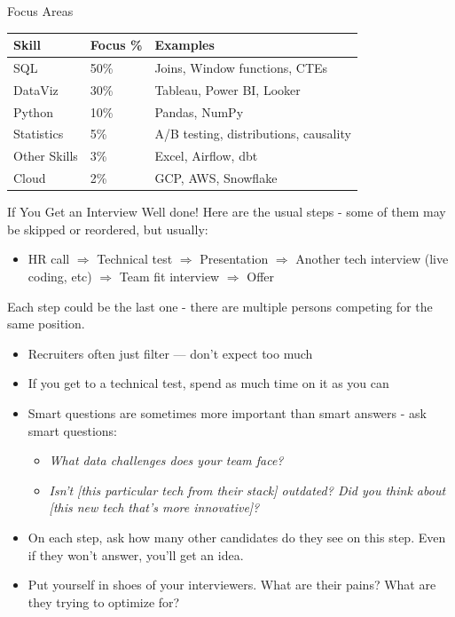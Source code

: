 \documentclass[10pt,a4paper]{article}
\begin{document}
\begin{multicols}{3}
\begin{textbox}{Focus Areas}
\begin{tabular}{l|l|l}
\textbf{Skill} & \textbf{Focus \%} & \textbf{Examples} \\
\hline
SQL & 50\% & Joins, Window functions, CTEs \\
DataViz & 30\% & Tableau, Power BI, Looker \\
Python & 10\% & Pandas, NumPy \\
Statistics & 5\% & A/B testing, distributions, causality \\
Other Skills & 3\% & Excel, Airflow, dbt \\
Cloud & 2\% & GCP, AWS, Snowflake \\
\end{tabular}
\end{textbox}
\begin{textboxGreen}{If You Get an Interview}
Well done! Here are the usual steps - some of them may be skipped or reordered, but usually:

\begin{itemize}
    \item HR call $\Rightarrow$ Technical test $\Rightarrow$ Presentation $\Rightarrow$ Another tech interview (live coding, etc) $\Rightarrow$ Team fit interview $\Rightarrow$ Offer
\end{itemize}

Each step could be the last one - there are multiple persons competing for the same position.

\begin{itemize}
    \item Recruiters often just filter --- don't expect too much
    \item If you get to a technical test, spend as much time on it as you can
    \item Smart questions are sometimes more important than smart answers - ask smart questions:
    \begin{itemize}
        \item \emph{What data challenges does your team face?}
        \item \emph{Isn't [this particular tech from their stack] outdated? Did you think about [this new tech that's more innovative]?}
    \end{itemize}
    \item On each step, ask how many other candidates do they see on this step. Even if they won't answer, you'll get an idea.
    \item Put yourself in shoes of your interviewers. What are their pains? What are they trying to optimize for?
\end{itemize}
\end{textboxGreen}


\end{multicols}
\end{document}
